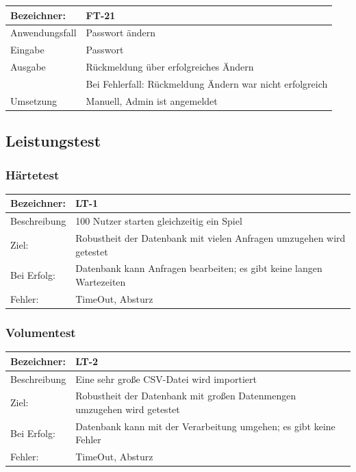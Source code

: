\documentclass[fontsize=12pt,paper=a4,twoside]{scrartcl}
\begin{document}
\begin{tabular}{|l|p{13.75cm}|}
\hline
	Bezeichner: & FT-21\\
\hline
	Anwendungsfall & Passwort ändern\\
\hline
	Eingabe & Passwort\\
\hline
	Ausgabe & Rückmeldung über erfolgreiches Ändern\\ &
	Bei Fehlerfall: Rückmeldung Ändern war nicht erfolgreich\\
\hline
	Umsetzung & Manuell, Admin ist angemeldet\\
\hline
\end{tabular}





\subsection{Leistungstest}\label{c10c}

\subsubsection{Härtetest}

\begin{tabular}{|l|p{13.75cm}|}
\hline
	Bezeichner: & LT-1\\
\hline
	Beschreibung & 100 Nutzer starten gleichzeitig ein Spiel\\
\hline
	Ziel: & Robustheit der Datenbank mit vielen Anfragen umzugehen wird getestet\\
\hline
	Bei Erfolg: & Datenbank kann Anfragen bearbeiten; es gibt keine langen Wartezeiten\\
\hline
	Fehler: & TimeOut, Absturz\\
\hline
\end{tabular}


\subsubsection{Volumentest}

\begin{tabular}{|l|p{13.75cm}|}
\hline
	Bezeichner: & LT-2\\
\hline
	Beschreibung & Eine sehr große CSV-Datei wird importiert\\
\hline
	Ziel: & Robustheit der Datenbank mit großen Datenmengen umzugehen wird getestet\\
\hline
	Bei Erfolg: & Datenbank kann mit der Verarbeitung umgehen; es gibt keine Fehler\\
\hline
	Fehler: & TimeOut, Absturz\\
\hline
\end{tabular}
\end{document}
